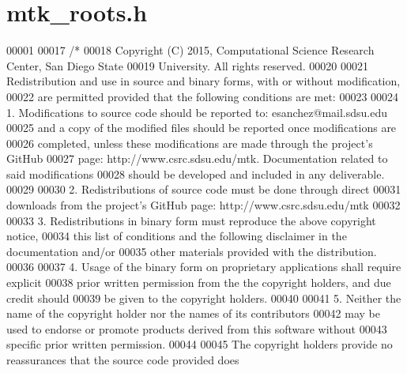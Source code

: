 \hypertarget{mtk__roots_8h_source}{\section{mtk\+\_\+roots.\+h}
\label{mtk__roots_8h_source}
}

\begin{DoxyCode}
00001 
00017 \textcolor{comment}{/*}
00018 \textcolor{comment}{Copyright (C) 2015, Computational Science Research Center, San Diego State}
00019 \textcolor{comment}{University. All rights reserved.}
00020 \textcolor{comment}{}
00021 \textcolor{comment}{Redistribution and use in source and binary forms, with or without modification,}
00022 \textcolor{comment}{are permitted provided that the following conditions are met:}
00023 \textcolor{comment}{}
00024 \textcolor{comment}{1. Modifications to source code should be reported to: esanchez@mail.sdsu.edu}
00025 \textcolor{comment}{and a copy of the modified files should be reported once modifications are}
00026 \textcolor{comment}{completed, unless these modifications are made through the project's GitHub}
00027 \textcolor{comment}{page: http://www.csrc.sdsu.edu/mtk. Documentation related to said modifications}
00028 \textcolor{comment}{should be developed and included in any deliverable.}
00029 \textcolor{comment}{}
00030 \textcolor{comment}{2. Redistributions of source code must be done through direct}
00031 \textcolor{comment}{downloads from the project's GitHub page: http://www.csrc.sdsu.edu/mtk}
00032 \textcolor{comment}{}
00033 \textcolor{comment}{3. Redistributions in binary form must reproduce the above copyright notice,}
00034 \textcolor{comment}{this list of conditions and the following disclaimer in the documentation and/or}
00035 \textcolor{comment}{other materials provided with the distribution.}
00036 \textcolor{comment}{}
00037 \textcolor{comment}{4. Usage of the binary form on proprietary applications shall require explicit}
00038 \textcolor{comment}{prior written permission from the the copyright holders, and due credit should}
00039 \textcolor{comment}{be given to the copyright holders.}
00040 \textcolor{comment}{}
00041 \textcolor{comment}{5. Neither the name of the copyright holder nor the names of its contributors}
00042 \textcolor{comment}{may be used to endorse or promote products derived from this software without}
00043 \textcolor{comment}{specific prior written permission.}
00044 \textcolor{comment}{}
00045 \textcolor{comment}{The copyright holders provide no reassurances that the source code provided does}

\end{DoxyCode}
